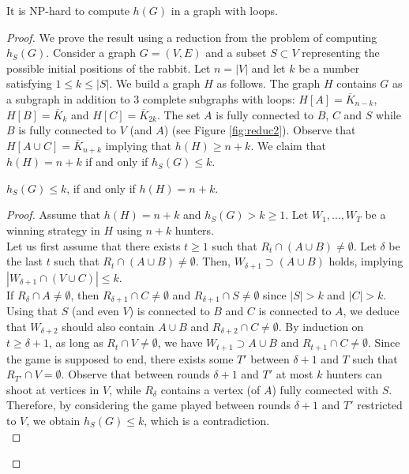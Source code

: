 \documentclass[runningheads]{llncs}
\begin{document}
\begin{proposition}
It is NP-hard to compute $h(G)$ in a graph with loops.
\label{pro:loop}
\end{proposition}
\begin{proof}
We prove the result using a reduction from the problem of computing $h_S(G)$.  
Consider a graph $G=(V,E)$ and a subset  $S \subset V$ representing the possible initial positions of the rabbit. Let $n=|V|$ and  let $k$ be a number satisfying $1 \leq k \leq |S|$. We build a graph $H$ as follows. The graph $H$ contains $G$ as a subgraph in addition to $3$ complete subgraphs with loops: {$H[A]=\overline{K}_{n-k}$, $H[B]=\overline{K}_{k}$ and $H[C]=\overline{K}_{2k}$}. The set $A$ is fully connected to $B$, $C$ and $S$  while $B$ is fully connected to $V$ (and $A$) (see Figure \ref{fig:reduc2}). 
Observe that {$H[A \cup C]=\overline{K}_{n+k}$}  implying that $h(H) \geq n + k$. We claim that $h(H) = n+k$ if and only if $h_S(G) \leq k$. 
\begin{claim}
$h_S(G) \leq k$, if and only if $h(H) = n+k$.
\end{claim}
\begin{proof}
Assume that $h(H) = n +k$ and $h_S(G) > k \geq 1$. Let $W_1,...,W_T$ be a winning strategy in $H$ using $n+k$ hunters.\\ 
Let us first assume that there exists $t \geq 1$ such that $R_t \cap (A \cup B)  \neq \emptyset$.  Let $\delta$ be the last $t$ such that $R_t \cap (A \cup B)  \neq \emptyset$. 
Then, $W_{\delta + 1} \supset (A \cup B) $ holds, {implying $|W_{\delta + 1} \cap (V\cup C)| \leq k$}. \\
If $R_{\delta} \cap A \neq \emptyset$, then $R_{\delta+1} \cap C \neq \emptyset$ and $R_{\delta+1} \cap S \neq \emptyset$ since $|S| >k$ and $|C| >k$.  Using that $S$ (and even $V$) is connected to $B$ and $C$ is connected to $A$, we deduce that $W_{\delta + 2}$ should also contain $ A \cup B$ {and $R_{\delta+2} \cap C \neq \emptyset$}. By induction on $t \geq \delta + 1$, as long as $R_t \cap V \neq \emptyset$,  we  have $W_{t+1} \supset A \cup B$ and $R_{t+1} \cap C \neq \emptyset$.
Since the game is supposed to end,  
there exists some $T'$ between $\delta+1$ and $T$ such that $R_{T'} \cap V = \emptyset$. {Observe that between rounds $\delta+1$ and $T'$ at most $k$ hunters can shoot at vertices in $V$, while $R_{\delta}$ contains a vertex (of $A$) fully connected with $S$. Therefore, by considering the game played between rounds $\delta+1$ and $T'$ restricted to $V$, we obtain $h_S(G)\le k$, which is a contradiction.\\ }%

\end{proof}
\end{proof}
\end{document}
